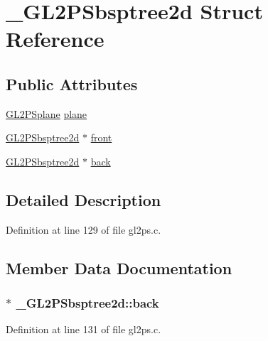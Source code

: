 \hypertarget{struct___g_l2_p_sbsptree2d}{}\section{\+\_\+\+G\+L2\+P\+Sbsptree2d Struct Reference}
\label{struct___g_l2_p_sbsptree2d}
\subsection*{Public Attributes}
\begin{DoxyCompactItemize}
\item 
\hyperlink{gl2ps_8c_ad999e09482788b5c0f9b7c6197a32e0d}{G\+L2\+P\+Splane} \hyperlink{struct___g_l2_p_sbsptree2d_a195602391127a5004d544030767bed25}{plane}
\item 
\hyperlink{gl2ps_8c_a5b053abb28288f41261327d47a298bea}{G\+L2\+P\+Sbsptree2d} $\ast$ \hyperlink{struct___g_l2_p_sbsptree2d_a3f41284e2e6400702967d4ab09515e0d}{front}
\item 
\hyperlink{gl2ps_8c_a5b053abb28288f41261327d47a298bea}{G\+L2\+P\+Sbsptree2d} $\ast$ \hyperlink{struct___g_l2_p_sbsptree2d_a4d23d76ea48b734ef6fd00bc3233945e}{back}
\end{DoxyCompactItemize}


\subsection{Detailed Description}


Definition at line 129 of file gl2ps.\+c.



\subsection{Member Data Documentation}
\hypertarget{struct___g_l2_p_sbsptree2d_a4d23d76ea48b734ef6fd00bc3233945e}{}
\subsubsection[{back}]{ $\ast$ \+\_\+\+G\+L2\+P\+Sbsptree2d\+::back}\label{struct___g_l2_p_sbsptree2d_a4d23d76ea48b734ef6fd00bc3233945e}


Definition at line 131 of file gl2ps.\+c.

